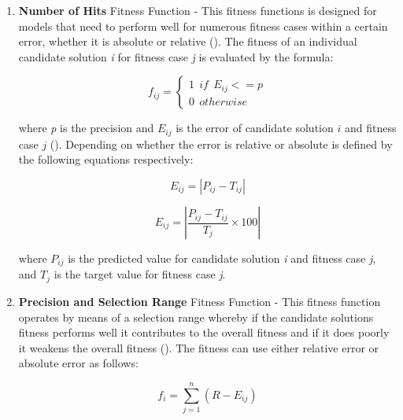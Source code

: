 \begin{enumerate}
    \item \textbf{Number of Hits} Fitness Function - This fitness functions is designed for models that need to perform well for numerous fitness cases within a certain error, whether it is absolute or relative (\cite{ferreira2006gene}). The fitness of an individual candidate solution \textit{i} for fitness case \textit{j} is evaluated by the formula:
    
    \begin{equation}\label{alg:number_of_hits}
        f_{ij} =
        \begin{cases} 
            1 \:\: if \:\: E_{ij}  <= p\\
            0 \:\: otherwise
        \end{cases}
    \end{equation}

    \noindent where \textit{p} is the precision and \textit{$E_{ij}$} is the error of candidate solution $i$ and fitness case $j$ (\cite{ferreira2006gene}). Depending on whether the error is relative or absolute is defined by the following equations respectively:

    \begin{equation}\label{alg:relative_error}
        E_{ij} = |P_{ij} - T_{ij}|
    \end{equation}

    \begin{equation}\label{alg:absolute_error}
        E_{ij} = |\frac{P_{ij} - T_{ij}}{T_j} \times 100|
    \end{equation}

    \noindent where \textit{$P_{ij}$} is the predicted value for candidate solution \textit{i} and fitness case \textit{j}, and \textit{$T_j$} is the target value for fitness case \textit{j}.


    \item \textbf{Precision and Selection Range} Fitness Function - This fitness function operates by means of a selection range whereby if the candidate solutions fitness performs well it contributes to the overall fitness and if it does poorly it weakens the overall fitness (\cite{ferreira2006gene}). The fitness can use either relative error or absolute error as follows:
    
    \begin{equation}\label{alg:relative_error2}
        f_i = \sum_{j=1}^{n}(R-E_{ij})
    \end{equation}


\end{enumerate}
